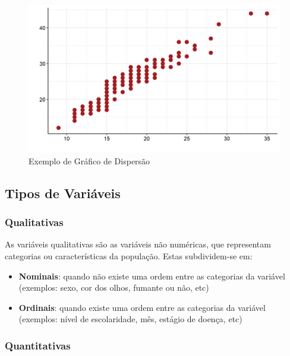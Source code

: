 \documentclass[
]{estat/estat}
\providecommand{\tightlist}{%
  \setlength{\itemsep}{0pt}\setlength{\parskip}{0pt}}\usepackage{longtable,booktabs,array}
\begin{document}
\begin{figure}[H]

\caption{Exemplo de Gráfico de Dispersão}

{\centering \includegraphics[width=158mm,height=\textheight]{images/disp_uni.png}

}

\end{figure}%

\subsection{Tipos de Variáveis}\label{tipos-de-variuxe1veis}

\subsubsection{Qualitativas}\label{qualitativas}

As variáveis qualitativas são as variáveis não numéricas, que
representam categorias ou características da população. Estas
subdividem-se em:

\begin{itemize}
\tightlist
\item
  \textbf{Nominais}: quando não existe uma ordem entre as categorias da
  variável (exemplos: sexo, cor dos olhos, fumante ou não, etc)
\item
  \textbf{Ordinais}: quando existe uma ordem entre as categorias da
  variável (exemplos: nível de escolaridade, mês, estágio de doença,
  etc)
\end{itemize}

\subsubsection{Quantitativas}\label{quantitativas}
\end{document}
